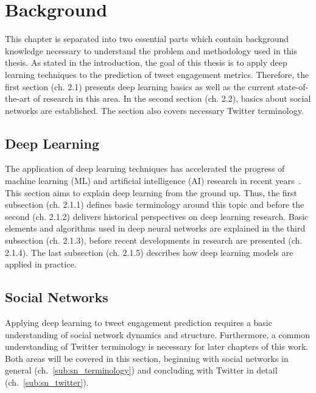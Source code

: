 \section{Background}
\label{ch:background}

This chapter is separated into two essential parts which contain background
knowledge necessary to understand the problem and methodology used in this 
thesis. As stated in the introduction, the goal of this thesis is to apply deep
learning techniques to the prediction of tweet engagement metrics. Therefore,
the first section (ch. 2.1) presents deep learning basics as well as the current
state-of-the-art of research in this area. In the second section (ch. 2.2), 
basics about social networks are established. The section also covers necessary 
Twitter terminology.

\subsection{Deep Learning}
\label{sec:deep_learning}

The application of deep learning techniques has accelerated the progress of 
machine learning (ML) and artificial intelligence (AI) research in recent years~\cite{Brynjolfsson2017}. 
This section aims to explain deep learning from the ground up. Thus, the 
first subsection (ch. 2.1.1) defines basic terminology around this topic 
and before the second (ch. 2.1.2) delivers historical perspectives on deep learning research. 
Basic elements and algorithms used in deep neural networks are explained in the third 
subsection (ch. 2.1.3), before recent developments in research are
presented (ch. 2.1.4). The last subsection (ch. 2.1.5) describes how
deep learning models are applied in practice.











\subsection{Social Networks}
\label{sec:social_networks}

Applying deep learning to tweet engagement prediction requires a basic
understanding of social network dynamics and structure. Furthermore, a common
understanding of Twitter terminology is necessary for later chapters of this
work. Both areas will be covered in this section, beginning with social
networks in general (ch.~\ref{sub:sn_terminology}) and concluding with
Twitter in detail (ch.~\ref{sub:sn_twitter}).




